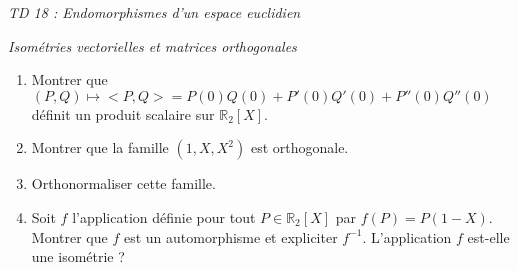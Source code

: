 \documentclass[a4paper,10pt]{report}
\begin{document}
\everymath{\displaystyle}

\begin{center}
\textit{{ {\huge TD 18 : Endomorphismes d'un espace euclidien}}}
\end{center}

\medskip

\medskip

\begin{center}
\textit{{ {\large Isométries vectorielles et matrices orthogonales}}}
\end{center}

\medskip

\begin{Exercice}{} 
\begin{enumerate}
\item Montrer que $(P,Q) \mapsto <P,Q> = P(0)Q(0)+ P'(0)Q'(0)+P''(0)Q''(0)$ définit un produit scalaire sur $\mathbb{R}_2[X]$.
\item Montrer que la famille $(1,X,X^2)$ est orthogonale.
\item Orthonormaliser cette famille.
\item Soit $f$ l'application définie pour tout $P \in \mathbb{R}_2[X]$ par $f(P)=P(1-X)$. Montrer que $f$ est un automorphisme et expliciter $f^{-1}$. L'application $f$ est-elle une isométrie ?
\end{enumerate}
\end{Exercice}
\end{document}
